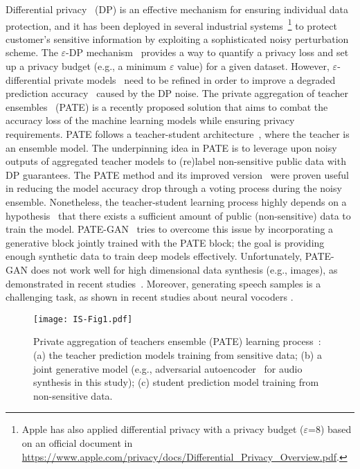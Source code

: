 \documentclass[a4paper]{article}
\begin{document}
Differential privacy~\cite{dwork2008differential} (DP) is an effective mechanism for ensuring individual data protection, and it has been deployed in several industrial systems~\cite{abadi2016deep, kifer2020guidelines}\footnote{Apple has also applied differential privacy with a privacy budget ($\varepsilon$=8) based on an official document in \url{https://www.apple.com/privacy/docs/Differential_Privacy_Overview.pdf}.} to protect customer's sensitive information by exploiting a sophisticated noisy perturbation scheme. The $\varepsilon$-DP mechanism~\cite{dwork2008differential} provides a way to quantify a privacy loss and set up a privacy budget (e.g., a minimum $\varepsilon$ value) for a given dataset. However, $\varepsilon$-differential private models~\cite{abadi2016deep} need to be refined in order to improve a degraded prediction accuracy~\cite{rajkumar2012differentially} caused by the DP noise. The private aggregation of teacher ensembles~\cite{papernot2016semi} (PATE) is a recently proposed solution that aims to combat the accuracy loss of the machine learning models while ensuring privacy requirements. PATE follows a teacher-student architecture~\cite{ hu2020relational}, where the teacher is an ensemble model. The underpinning idea in PATE is to leverage upon noisy outputs of aggregated teacher models to (re)label non-sensitive public data with DP guarantees. The PATE method and its improved version~\cite{papernot2018scalable} were proven useful in reducing the model accuracy drop through a voting process during the noisy ensemble. Nonetheless, the teacher-student learning process highly depends on a hypothesis~\cite{papernot2016semi, papernot2018scalable, jordon2019pate} that there exists a sufficient amount of public (non-sensitive) data to train the model. PATE-GAN~\cite{jordon2019pate} tries to overcome this issue by incorporating a generative block jointly trained with the PATE block; the goal is providing enough synthetic data to train deep models effectively. Unfortunately, PATE-GAN does not work well for high dimensional data synthesis (e.g., images), as demonstrated in recent studies~\cite{chen2020gs, haque2020high}. Moreover, generating speech samples is a challenging task, as shown in recent studies about neural vocoders \cite{rethage2018wavenet, oord2016wavenet}.

\begin{figure}[ht!]
    \centering
    \texttt{[image: IS-Fig1.pdf]}
    \caption{Private aggregation of teachers ensemble (PATE) learning process~\cite{papernot2016semi, papernot2018scalable}: (a) the teacher prediction models training from sensitive data; (b) a joint generative model (e.g., adversarial autoencoder~\cite{makhzani2015adversarial} for audio synthesis in this study); (c) student prediction model training from non-sensitive data. }
    \label{fig:1}
\end{figure}
\end{document}
